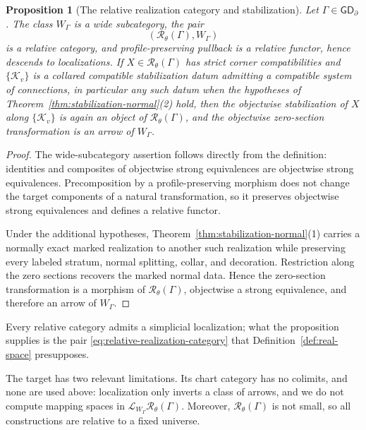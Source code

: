 \documentclass[11pt,letterpaper,twoside]{article}
\theoremstyle{plain}
\newtheorem{proposition}[theorem]{Proposition}
\theoremstyle{definition}
\theoremstyle{remark}
\newcommand{\BGrm}{\mathsf{GD}_{\partial}}
\begin{document}
\begin{proposition}[The relative realization category and stabilization]\label{prop:target-localization}
Let \(\Gamma\in\BGrm\).  The class \(W_\Gamma\) is a wide subcategory, the pair
\begin{equation}\label{eq:relative-realization-category}
 \left(\mathcal R_\theta(\Gamma),W_\Gamma\right)
\end{equation}
is a relative category, and profile-preserving pullback is a relative functor, hence descends to localizations.  If \(X\in\mathcal R_\theta(\Gamma)\) has strict corner compatibilities and \(\{\mathcal K_v\}\) is a collared compatible stabilization datum admitting a compatible system of connections, in particular any such datum when the hypotheses of Theorem~\ref{thm:stabilization-normal}(2) hold, then the objectwise stabilization of \(X\) along \(\{\mathcal K_v\}\) is again an object of \(\mathcal R_\theta(\Gamma)\), and the objectwise zero-section transformation is an arrow of \(W_\Gamma\).
\end{proposition}

\begin{proof}
The wide-subcategory assertion follows directly from the definition: identities and composites of objectwise strong equivalences are objectwise strong equivalences.  Precomposition by a profile-preserving morphism does not change the target components of a natural transformation, so it preserves objectwise strong equivalences and defines a relative functor.

Under the additional hypotheses, Theorem~\ref{thm:stabilization-normal}(1) carries a normally exact marked realization to another such realization while preserving every labeled stratum, normal splitting, collar, and decoration.  Restriction along the zero sections recovers the marked normal data.  Hence the zero-section transformation is a morphism of \(\mathcal R_\theta(\Gamma)\), objectwise a strong equivalence, and therefore an arrow of \(W_\Gamma\).
\end{proof}

Every relative category admits a simplicial localization; what the proposition supplies is the pair \eqref{eq:relative-realization-category} that Definition~\ref{def:real-space} presupposes.

The target has two relevant limitations.  Its chart category has no colimits, and none are used above: localization only inverts a class of arrows, and we do not compute mapping spaces in \(\mathcal L_{W_\Gamma}\mathcal R_\theta(\Gamma)\).  Moreover, \(\mathcal R_\theta(\Gamma)\) is not small, so all constructions are relative to a fixed universe.
\end{document}
